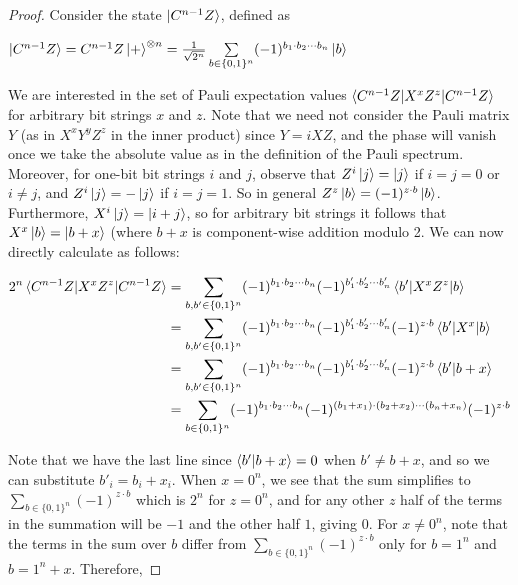 \documentclass[12pt]{dalthesis}
\begin{document}
\begin{proof}
Consider the state $\ket{C^{n-1}Z}$, defined as 
\begin{center}
$\ket{C^{n-1}Z} = C^{n-1}Z\ket{+}^{\otimes n} = \frac{1}{\sqrt{2^n}} \sum\limits_{b \in \{0, 1\}^n} (-1)^{b_1 \cdot b_2 \cdots b_n} \ket{b}$
\end{center}
We are interested in the set of Pauli expectation values $\braket{C^{n-1}Z|X^xZ^z|C^{n-1}Z}$ for arbitrary bit strings $x$ and $z$. Note that we need not consider the Pauli matrix $Y$ (as in $X^xY^yZ^z$ in the inner product) since $Y = iXZ$, and the phase will vanish once we take the absolute value as in the definition of the Pauli spectrum. Moreover, for one-bit bit strings $i$ and $j$, observe that $Z^i \ket{j} = \ket{j}$ if $i=j=0$ or $i \neq j$, and $Z^i \ket{j} = -\ket{j}$ if $i=j=1$. So in general $Z^z \ket{b} = (-1)^{z \cdot b}\ket{b}$. Furthermore, $X^i \ket{j} = \ket{i+j}$, so for arbitrary bit strings it follows that $X^x\ket{b} = \ket{b + x}$ (where $b+x$ is component-wise addition modulo 2. We can now directly calculate as follows:

\begin{equation}
\begin{split}
2^n\braket{C^{n-1}Z|X^xZ^z|C^{n-1}Z} & = \sum\limits_{b, b' \in \{0, 1\}^n} (-1)^{b_1 \cdot b_2 \cdots b_n} (-1)^{b'_1 \cdot b'_2 \cdots b'_n} \braket{b'|X^xZ^z|b} \\
& = \sum\limits_{b, b' \in \{0, 1\}^n} (-1)^{b_1 \cdot b_2 \cdots b_n} (-1)^{b'_1 \cdot b'_2 \cdots b'_n} (-1)^{z \cdot b} \braket{b'|X^x|b} \\
& = \sum\limits_{b, b' \in \{0, 1\}^n} (-1)^{b_1 \cdot b_2 \cdots b_n} (-1)^{b'_1 \cdot b'_2 \cdots b'_n} (-1)^{z \cdot b} \braket{b'|b + x} \\
& = \sum\limits_{b \in \{0, 1\}^n} (-1)^{b_1 \cdot b_2 \cdots b_n} (-1)^{(b_1 + x_1) \cdot (b_2 + x_2) \cdots (b_n + x_n)} (-1)^{z \cdot b}
\end{split}
\end{equation}


Note that we have the last line since $\braket{b'|b+x} = 0$ when $b' \neq b + x$, and so we can substitute $b'_i = b_i + x_i$. When $x=0^n$, we see that the sum simplifies to $\sum_{b \in \{0, 1\}^n} (-1)^{z \cdot b}$ which is $2^n$ for $z=0^n$, and for any other $z$ half of the terms in the summation will be $-1$ and the other half $1$, giving $0$. For $x \neq 0^n$, note that the terms in the sum over $b$ differ from $\sum_{b \in \{0, 1\}^n} (-1)^{z \cdot b}$ only for $b = 1^n$ and $b = 1^n + x$. Therefore,


\end{proof}
\end{document}
